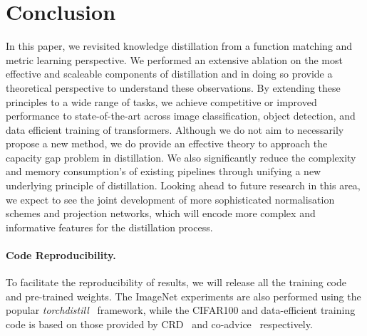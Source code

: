 \documentclass[letterpaper]{article} \usepackage[submission]{aaai23}  \usepackage{times}  \usepackage{helvet}  \usepackage{courier}  \usepackage[hyphens]{url}  \usepackage{graphicx} \urlstyle{rm} \def\UrlFont{\rm}  \usepackage{natbib}  \usepackage{caption} \frenchspacing  \setlength{\pdfpagewidth}{8.5in} \setlength{\pdfpageheight}{11in} \usepackage{algorithm}
\begin{document}
\section{Conclusion}
\label{sec:conclusion}
In this paper, we revisited knowledge distillation from a function matching and metric learning perspective. We performed an extensive ablation on the most effective and scaleable components of distillation and in doing so provide a theoretical perspective to understand these observations. By extending these principles to a wide range of tasks, we achieve competitive or improved performance to state-of-the-art across image classification, object detection, and data efficient training of transformers. Although we do not aim to necessarily propose a new method, we do provide an effective theory to approach the capacity gap problem in distillation. We also significantly reduce the complexity and memory consumption's of existing pipelines through unifying a new underlying principle of distillation. Looking ahead to future research in this area, we expect to see the joint development of more sophisticated normalisation schemes and projection networks, which will encode more complex and informative features for the distillation process. 

\paragraph{Code Reproducibility.} To facilitate the reproducibility of results, we will release all the training code and pre-trained weights. The ImageNet experiments are also performed using the popular \textit{torchdistill}~\cite{Matsubara2020TorchdistillDistillation} framework, while the CIFAR100 and data-efficient training code is based on those provided by CRD~\cite{Tian2019ContrastiveDistillation} and co-advice~\cite{Ren2022Co-advise:Distillation} respectively.


\end{document}
